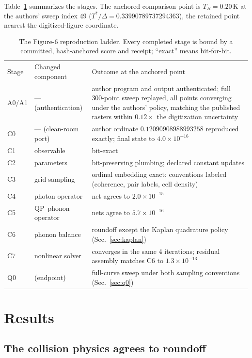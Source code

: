 \documentclass[reprint,amsmath,amssymb,aps,prapplied,nofootinbib]{revtex4-2}
\begin{document}
Table~\ref{tab:ladder} summarizes the stages.  The anchored comparison
point is $T_B = 0.20\,$K at the authors' sweep index 49
($T^*/\Delta = 0.33990789737294363$), the retained point nearest the
digitized-figure coordinate.

\begin{table}[t]
\caption{\label{tab:ladder}The Figure-6 reproduction ladder.  Every
completed stage is bound by a committed, hash-anchored score and
receipt; ``exact'' means bit-for-bit.}
\begin{ruledtabular}
\begin{tabular}{llp{4.2cm}}
Stage & Changed component & Outcome at the anchored point \\
\colrule
A0/A1 & --- (authentication) & author program and output authenticated;
full 300-point sweep replayed, all points converging under the authors'
policy, matching the published rasters within $0.12\times$ the
digitization uncertainty \\
C0 & --- (clean-room port) & author ordinate $0.12090908988993258$
reproduced exactly; final state to $4.0\times10^{-16}$ \\
C1 & observable & bit-exact \\
C2 & parameters & bit-preserving plumbing; declared constant updates \\
C3 & grid sampling & ordinal embedding exact; conventions labeled
(coherence, pair labels, cell density) \\
C4 & photon operator & net agrees to $2.0\times10^{-15}$ \\
C5 & QP--phonon operator & nets agree to $5.7\times10^{-16}$ \\
C6 & phonon balance & roundoff except the Kaplan quadrature policy
(Sec.~\ref{sec:kaplan}) \\
C7 & nonlinear solver & converges in the same 4 iterations; residual
assembly matches C6 to $1.3\times10^{-13}$ \\
Q0 & (endpoint) & full-curve sweep under both sampling conventions
(Sec.~\ref{sec:q0}) \\
\end{tabular}
\end{ruledtabular}
\end{table}

\section{Results}

\subsection{The collision physics agrees to roundoff}
\end{document}

